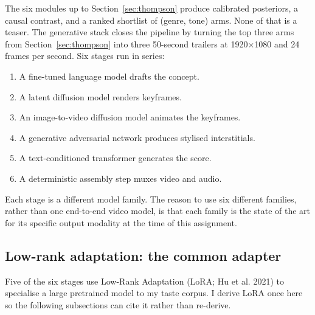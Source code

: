 \documentclass{article}
\begin{document}
The six modules up to Section~\ref{sec:thompson} produce calibrated posteriors, a causal contrast, and a ranked shortlist of (genre, tone) arms. None of that is a teaser. The generative stack closes the pipeline by turning the top three arms from Section~\ref{sec:thompson} into three 50-second trailers at 1920$\times$1080 and 24 frames per second. Six stages run in series:
\begin{enumerate}
	\item A fine-tuned language model drafts the concept.
	\item A latent diffusion model renders keyframes.
	\item An image-to-video diffusion model animates the keyframes.
	\item A generative adversarial network produces stylised interstitials.
	\item A text-conditioned transformer generates the score.
	\item A deterministic assembly step muxes video and audio.
\end{enumerate}

Each stage is a different model family. The reason to use six different families, rather than one end-to-end video model, is that each family is the state of the art for its specific output modality at the time of this assignment.

\subsection{Low-rank adaptation: the common adapter}

\label{sec:lora}

Five of the six stages use Low-Rank Adaptation (LoRA; Hu et al. 2021) to specialise a large pretrained model to my taste corpus. I derive LoRA once here so the following subsections can cite it rather than re-derive.
\end{document}
